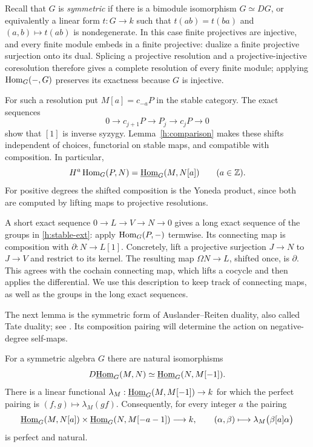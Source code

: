 Recall that $G$ is \emph{symmetric} if there is a bimodule isomorphism
$G\simeq DG$, or equivalently a linear form $t:G\to k$ such that
$t(ab)=t(ba)$ and $(a,b)\mapsto t(ab)$ is nondegenerate. In this case finite
projectives are injective, and every finite module embeds in a finite
projective: dualize a finite projective surjection onto its dual.
Splicing a projective resolution and a projective-injective coresolution
therefore gives a complete resolution of every finite module; applying
$\operatorname{Hom}_G(-,G)$ preserves its exactness because $G$ is injective.

For such a resolution put $M[a]=c_{-a}P$ in the stable category. The exact
sequences
\begin{equation}\label{h:syzygy-sequence}
 0\longrightarrow c_{j+1}P\longrightarrow P_j
 \longrightarrow c_jP\longrightarrow0
\end{equation}
show that $[1]$ is inverse syzygy. Lemma~\ref{h:comparison} makes these
shifts independent of choices, functorial on stable maps, and compatible
with composition. In particular,
\begin{equation}\label{h:stable-ext}
 H^a\operatorname{Hom}_G(P,N)=\underline{\operatorname{Hom}}_G(M,N[a])\qquad(a\in\mathbb Z).
\end{equation}
For positive degrees the shifted composition is the Yoneda product, since
both are computed by lifting maps to projective resolutions.

A short exact sequence $0\to L\to V\to N\to0$ gives a long exact sequence
of the groups in \eqref{h:stable-ext}: apply $\operatorname{Hom}_G(P,-)$ termwise.
Its connecting map is composition with $\partial:N\to L[1]$. Concretely,
lift a projective surjection $J\to N$ to $J\to V$ and restrict to its kernel.
The resulting map $\Omega N\to L$, shifted once, is $\partial$.
This agrees with the cochain connecting map, which lifts a cocycle and
then applies the differential. We use this description to keep track of
connecting maps, as well as the groups in the long exact sequences.

The next lemma is the symmetric form of Auslander--Reiten duality,
also called Tate duality; see
\cite[Section~2, (2.3) and (2.7)--(2.8)]{Linckelmann2013}.
Its composition pairing will determine the action on negative-degree
self-maps.

\begin{lemma}\label{h:duality}
For a symmetric algebra $G$ there are natural isomorphisms
\begin{equation}\label{h:duality-formula}
 D\underline{\operatorname{Hom}}_G(M,N)\simeq\underline{\operatorname{Hom}}_G(N,M[-1]).
\end{equation}
There is a linear functional $\lambda_M:\underline{\operatorname{Hom}}_G(M,M[-1])\to k$ for which
the perfect pairing is $(f,g)\mapsto\lambda_M(gf)$. Consequently, for every
integer $a$ the pairing
\begin{equation}\label{h:shifted-pairing}
 \underline{\operatorname{Hom}}_G(M,N[a])\times\underline{\operatorname{Hom}}_G(N,M[-a-1])\longrightarrow k,
 \qquad (\alpha,\beta)\longmapsto\lambda_M\bigl(\beta[a]\alpha\bigr)
\end{equation}
is perfect and natural.
\end{lemma}

